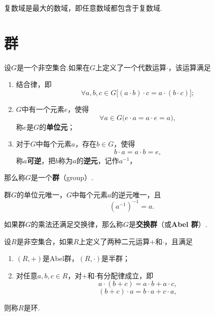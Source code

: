 \begin{theorem}
复数域是最大的数域，即任意数域都包含于复数域.
\end{theorem}


\section{群}
\begin{definition}
设\(G\)是一个非空集合.如果在\(G\)上定义了一个代数运算\(\cdot\)，该运算满足
\begin{enumerate}
\item 结合律，即\[
\forall a,b,c \in G \bigl[ (a \cdot b) \cdot c = a \cdot (b \cdot c) \bigr];
\]
\item \(G\)中有一个元素\(e\)，使得\[
\forall a \in G \bigl( e \cdot a = a \cdot e = a \bigr),
\]称\(e\)是\(G\)的\textbf{单位元}；
\item 对于\(G\)中每个元素\(a\)，存在\(b \in G\)，使得\[
b \cdot a = a \cdot b = e,
\]称\(a\)\textbf{可逆}，把\(b\)称为\(a\)的\textbf{逆元}，记作\(a^{-1}\)，%
\end{enumerate}
那么称\(G\)是一个\textbf{群}（group）.
\end{definition}

\begin{property}
群\(G\)的单位元唯一，\(G\)中每个元素\(a\)的逆元唯一，且\[
(a^{-1})^{-1} = a.
\]
\end{property}

\begin{definition}
如果群\(G\)的乘法还满足交换律，那么称\(G\)是\textbf{交换群}（或\textbf{Abel 群}）.
\end{definition}

\begin{theorem}
设\(R\)是非空集合，如果\(R\)上定义了两种二元运算\(+\)和\(\cdot\)，且满足\begin{enumerate}
\item \((R,+)\)是Abel群，\((R,\cdot)\)是半群；
\item 对任意\(a,b,c \in R\)，对\(+\)和\(\cdot\)有分配律成立，即\[
a \cdot (b + c) = a \cdot b + a \cdot c,
\]\[
(b + c) \cdot a = b \cdot a + c \cdot a,
\]
\end{enumerate}则称\(R\)是环.
\end{theorem}
